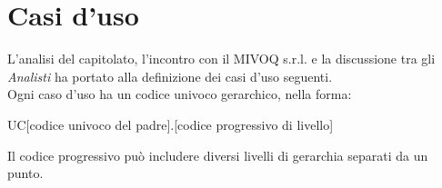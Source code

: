 \section{Casi d'uso}
L’analisi del capitolato, l’incontro con il MIVOQ s.r.l. e la discussione tra gli \textit{Analisti} ha
portato alla definizione dei casi d’uso seguenti.\\
Ogni caso d’uso ha un codice univoco gerarchico, nella forma:\\
\begin{center}
UC[codice univoco del padre].[codice progressivo di livello]
\end{center}
Il codice progressivo può includere diversi livelli di gerarchia separati da un punto.